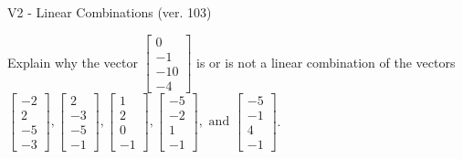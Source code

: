 \begin{exercise}
  \begin{exerciseTitle}V2 - Linear Combinations (ver. 103)\end{exerciseTitle}
  \begin{exerciseStatement}
    Explain why the vector \(\left[\begin{array}{c}
0 \\
-1 \\
-10 \\
-4
\end{array}\right]\)  is or is not a linear 
	combination of the vectors \(\left[\begin{array}{c}
-2 \\
2 \\
-5 \\
-3
\end{array}\right] , \left[\begin{array}{c}
2 \\
-3 \\
-5 \\
-1
\end{array}\right] , \left[\begin{array}{c}
1 \\
2 \\
0 \\
-1
\end{array}\right] , \left[\begin{array}{c}
-5 \\
-2 \\
1 \\
-1
\end{array}\right] , \text{ and } \left[\begin{array}{c}
-5 \\
-1 \\
4 \\
-1
\end{array}\right]\).
	



\end{exerciseStatement}
\end{exercise}
